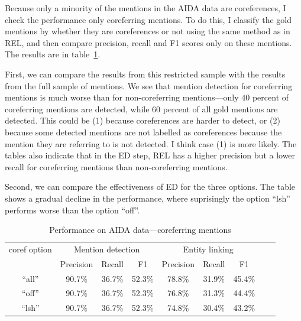\documentclass[a4paper,11pt]{article}
\numberwithin{equation}{section} %
\begin{document}
Because only a minority of the mentions in the AIDA data are coreferences, I check the performance only coreferring mentions. To do this, I classify the gold mentions by whether they are coreferences or not using the same method as in REL, and then compare precision, recall and F1 scores only on these mentions. The results are in table~\ref{tab:performance_aida_corefs}. 

First, we can compare the results from this restricted sample with the results from the full sample of mentions. We see that mention detection for coreferring mentions is much worse than for non-coreferring mentions---only 40 percent of coreferring mentions are detected, while 60 percent of all gold mentions are detected. 
This could be (1) because coreferences are harder to detect, or (2) because some detected mentions are not labelled as coreferences because the mention they are referring to is not detected. I think case (1) is more likely.
The tables also indicate that in the ED step, REL has a higher precision but a lower recall for coreferring mentions than non-coreferring mentions. 

Second, we can compare the effectiveness of ED for the three options. The table shows a gradual decline in the performance, where suprisingly the option ``lsh'' performs worse than the option ``off''.


\begin{table}
 \begin{tabular}{c c c c c c c c c}
\hline
 coref option & \multicolumn{3}{c}{Mention detection} & \multicolumn{3}{c}{Entity linking}  \\
        & Precision & Recall & F1 & Precision & Recall & F1 \\
 \hline 
 ``all'' & 90.7\% & 36.7\% & 52.3\% & 78.8\% & 31.9\% & 45.4\% \\  
 ``off'' & 90.7\% & 36.7\% & 52.3\% & 76.8\% & 31.3\% & 44.4\% \\ 
 ``lsh'' & 90.7\% & 36.7\% & 52.3\% & 74.8\% & 30.4\% & 43.2\% \\
\hline 
\end{tabular}
\caption{Performance on AIDA data---coreferring mentions}
\label{tab:performance_aida_corefs}
\end{table}
\end{document}
